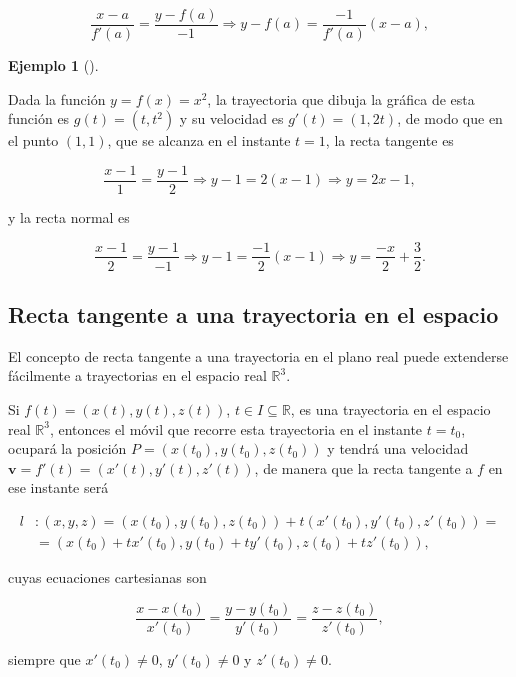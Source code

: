 \documentclass[
  a4paper,
]{scrreport}
\theoremstyle{plain}
\theoremstyle{definition}
\theoremstyle{plain}
\theoremstyle{plain}
\theoremstyle{definition}
\newtheorem{example}{Ejemplo}[chapter]
\theoremstyle{definition}
\theoremstyle{remark}
\begin{document}
\[
\frac{x-a}{f'(a)} = \frac{y-f(a)}{-1} \Rightarrow y-f(a) = \frac{-1}{f'(a)}(x-a),
\]

\begin{example}[]\protect\hypertarget{exm-tangente-normal-funcion-2}{}\label{exm-tangente-normal-funcion-2}

Dada la función \(y=f(x)=x^2\), la trayectoria que dibuja la gráfica de
esta función es \(g(t)=(t,t^2)\) y su velocidad es \(g'(t)=(1,2t)\), de
modo que en el punto \((1,1)\), que se alcanza en el instante \(t=1\),
la recta tangente es

\[
\frac{x-1}{1} = \frac{y-1}{2} \Rightarrow y-1 = 2(x-1) \Rightarrow y = 2x-1,
\]

y la recta normal es

\[
\frac{x-1}{2} = \frac{y-1}{-1} \Rightarrow y-1 = \frac{-1}{2}(x-1) \Rightarrow y = \frac{-x}{2}+\frac{3}{2}.
\]

\end{example}

\subsection{Recta tangente a una trayectoria en el
espacio}\label{recta-tangente-a-una-trayectoria-en-el-espacio}

El concepto de recta tangente a una trayectoria en el plano real puede
extenderse fácilmente a trayectorias en el espacio real
\(\mathbb{R}^3\).

Si \(f(t)=(x(t),y(t),z(t))\), \(t\in I\subseteq \mathbb{R}\), es una
trayectoria en el espacio real \(\mathbb{R}^3\), entonces el móvil que
recorre esta trayectoria en el instante \(t=t_0\), ocupará la posición
\(P=(x(t_0),y(t_0),z(t_0))\) y tendrá una velocidad
\(\mathbf{v}=f'(t)=(x'(t),y'(t),z'(t))\), de manera que la recta
tangente a \(f\) en ese instante será

\begin{align*}
l&: (x,y,z)=(x(t_0),y(t_0),z(t_0))+t(x'(t_0),y'(t_0),z'(t_0)) =\\
&= (x(t_0)+tx'(t_0),y(t_0)+ty'(t_0),z(t_0)+tz'(t_0)),
\end{align*}

cuyas ecuaciones cartesianas son

\[
\frac{x-x(t_0)}{x'(t_0)}=\frac{y-y(t_0)}{y'(t_0)}=\frac{z-z(t_0)}{z'(t_0)},
\]

siempre que \(x'(t_0)\neq 0\), \(y'(t_0)\neq 0\) y \(z'(t_0)\neq 0\).
\end{document}
